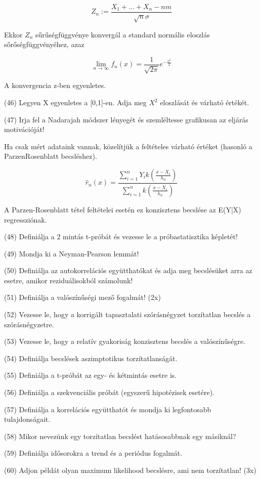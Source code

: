 \documentclass[12p]{article}
\begin{document}
$$Z_n := \frac{X_1 + ... + X_n - nm}{\sqrt{n}\sigma}$$

Ekkor $Z_n$ sűrűségfüggvénye konvergál a standard normális
eloszlás sőrőségfüggvényéhez, azaz

$$\lim_{n \rightarrow \infty} f_n(x) = \frac{1}{\sqrt{2\pi}} e^{- \frac{x^2}{2}}$$

A konvergencia z-ben egyenletes.

(46) Legyen X egyenletes a [0,1]-en. Adja meg $X^2$ eloszlását és várható értékét.

(47) Irja fel a Nadarajah módszer lényegét és szemléltesse grafikusan az eljárás motivációját! 

Ha csak mért adataink vannak, közelítjük a
feltételes várható értéket (hasonló a ParzenRosenblatt becsléshez).

$$\hat{r}_n(x) = \frac{\displaystyle{\sum^n_{i=1} Y_ik \left(\frac{x - X_i}{h_n}\right)}}{\displaystyle{\sum^n_{i=1} k \left(\frac{x - X_i}{h_n}\right)}}$$

A Parzen-Rosenblatt tétel feltételei esetén ez
konzisztens becslése az E(Y|X) regressziónak.

(48) Definiálja a 2 mintás t-próbát és vezesse le a próbastatisztika képletét! 

(49) Mondja ki a Neyman-Pearson lemmát!

(50) Definiálja az autokorrelációs együtthatókat és adja meg becslésüket arra az esetre, amikor reziduálisokból számolunk! 

(51) Definiálja a valószínűségi mező fogalmát! (2x)



(52) Vezesse le, hogy a korrigált tapasztalati szórásnégyzet torzítatlan becslés a szórásnégyzetre. 

(53) Vezesse le, hogy a relatív gyakoriság konzisztens becslés a valószínűségre.

(54) Definiálja becslések aszimptotikus torzítatlanságát.

(55) Definiálja a t-próbát az egy- és kétmintás esetre is.

(56) Definiálja a szekvenciális próbát (egyszerű hipotézisek esetére).

(57) Definiálja a korrelációs együtthatót és mondja ki legfontosabb tulajdonságait.

(58) Mikor nevezünk egy torzítatlan becslést hatásosabbnak egy másiknál?

(59) Definiálja idősorokra a trend és a periódus fogalmát.

(60) Adjon példát olyan maximum likelihood becslésre, ami nem torzítatlan! (3x)
\end{document}
